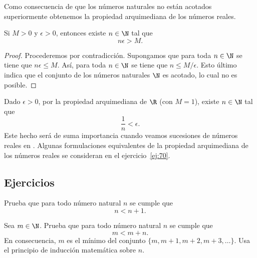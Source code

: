 \documentclass[12pt,a4paper]{book}
\begin{document}
    Como consecuencia de que los números naturales no están acotados
    superiormente obtenemos la propiedad arquimediana de los números reales.

    \begin{proposicion}\label{prop:18}
        Si $M>0$ y $\epsilon>0$,
        entonces existe $n\in\N$ tal que
        \begin{equation*}
            n\epsilon>M.
        \end{equation*}
    \end{proposicion}

    \begin{proof}
        Procederemos por contradicción. Supongamos que para toda
        $n\in\N$ se tiene que $n\epsilon\leq M$. Así, para toda $n\in\N$ se tiene que $n\leq M/\epsilon$. Esto
        último indica que el conjunto de los números naturales $\N$ es acotado, lo cual
        no es posible.
    \end{proof}

    Dado $\epsilon>0$, por la propiedad arquimediana de $\R$ (con $M=1$), existe
    $n\in\N$ tal que
    \begin{equation*}
        \frac{1}{n}<\epsilon.
    \end{equation*}
    Este hecho será de suma importancia cuando veamos sucesiones de números
    reales en \cite{nunez2020calculoII}. Algunas formulaciones equivalentes de la propiedad arquimediana
    de los números reales se consideran en el ejercicio~\ref{ej:70}.

    \par{}\subsection*{Ejercicios}

    \begin{ejercicio}\label{ej:50}
        Prueba que para todo número natural $n$ se cumple que
        \begin{equation*}
            n<n+1.
        \end{equation*}
    \end{ejercicio}

    \begin{ejercicio}\label{ej:51}
        Sea $m\in\N$. Prueba que para todo número natural $n$ se cumple
        que
        \begin{equation*}
            m<m+n.
        \end{equation*}
        En consecuencia, $m$ es el mínimo del conjunto $\{m,m+1,m+2,m+3,\ldots\}$.
        \sugerencia Usa el principio de inducción matemática sobre $n$.
    \end{ejercicio}
\end{document}

